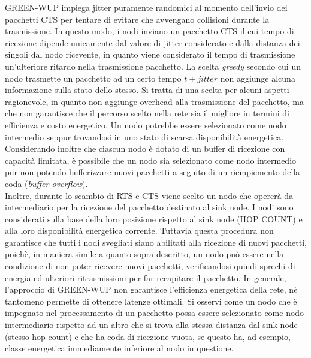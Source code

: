 \documentclass{report}
\begin{document}
GREEN-WUP impiega jitter puramente randomici al momento dell'invio dei pacchetti CTS per tentare di evitare che avvengano collisioni durante
la trasmissione. In questo modo, i nodi inviano un pacchetto CTS il cui tempo di ricezione dipende unicamente dal valore di jitter
considerato e dalla distanza dei singoli dal nodo ricevente, in quanto viene considerato il tempo di trasmissione un'ulteriore ritardo nella
trasmissione pacchetto. La scelta \emph{greedy} secondo cui un nodo trasmette un pacchetto ad un certo tempo $t+jitter$ non aggiunge alcuna
informazione sulla stato dello stesso. Si tratta di una scelta per alcuni aspetti ragionevole, in quanto non aggiunge overhead alla trasmissione
del pacchetto, ma che non garantisce che il percorso scelto nella rete sia il migliore in termini di efficienza e costo energetico. Un nodo
potrebbe essere selezionato come nodo intermedio seppur trovandosi in uno stato di scarsa disponibilità energetica. Considerando inoltre che 
ciascun nodo è dotato di un buffer di ricezione con capacità limitata, è possibile che un nodo sia selezionato come nodo intermedio pur non 
potendo bufferizzare nuovi pacchetti a seguito di un riempiemento della coda (\emph{buffer overflow}).\\

Inoltre, durante lo scambio di RTS e CTS viene scelto un nodo che opererà da intermediario per la ricezione del pacchetto destinato
al sink node. I nodi sono considerati sulla base della loro posizione rispetto al sink node (HOP COUNT) e alla loro disponibilità energetica corrente.
Tuttavia questa procedura non garantisce che tutti i nodi svegliati siano abilitati alla ricezione di nuovi pacchetti, poichè, in maniera simile a
quanto sopra descritto, un nodo può essere nella condizione di non poter ricevere nuovi pacchetti, verificandosi quindi sprechi di energia ed
ulteriori ritrasmissioni per far recapitare il pacchetto. In generale, l'approccio di GREEN-WUP non garantisce l'efficienza energetica della rete,
nè tantomeno permette di ottenere latenze ottimali. Si osservi come un nodo che è impegnato nel processamento di un pacchetto possa essere selezionato
come nodo intermediario rispetto ad un altro che si trova alla stessa distanza dal sink node (stesso hop count) e che ha coda di ricezione vuota, se questo
ha, ad esempio, classe energetica immediamente inferiore al nodo in questione. \\
\end{document}
